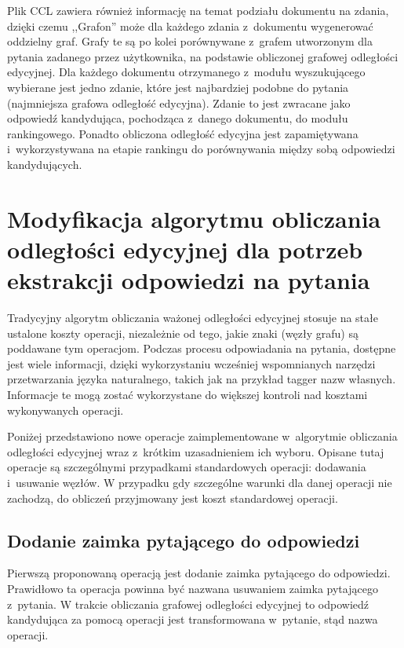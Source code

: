 \documentclass[a4paper, twoside, openright, 12pt]{report}
\begin{document}
        Plik CCL zawiera również informację na temat podziału dokumentu na zdania, dzięki czemu ,,Grafon'' może dla każdego
        zdania z~dokumentu wygenerować oddzielny graf. Grafy te są po kolei porównywane z~grafem utworzonym dla pytania
        zadanego przez użytkownika, na podstawie obliczonej grafowej odległości edycyjnej. Dla każdego dokumentu otrzymanego
        z~modułu wyszukującego wybierane jest jedno zdanie, które jest najbardziej podobne do pytania (najmniejsza grafowa
        odległość edycyjna). Zdanie to jest zwracane jako odpowiedź kandydująca, pochodząca z~danego dokumentu, do modułu
        rankingowego. Ponadto obliczona odległość edycyjna jest zapamiętywana i~wykorzystywana na etapie rankingu do porównywania
        między sobą odpowiedzi kandydujących.

    \section{Modyfikacja algorytmu obliczania odległości edycyjnej dla potrzeb ekstrakcji odpowiedzi na pytania}
        Tradycyjny algorytm obliczania ważonej odległości edycyjnej stosuje na stałe ustalone koszty operacji, niezależnie
        od tego, jakie znaki (węzły grafu) są poddawane tym operacjom. Podczas procesu odpowiadania na pytania, dostępne
        jest wiele informacji, dzięki wykorzystaniu wcześniej wspomnianych narzędzi przetwarzania języka naturalnego,
        takich jak na przykład tagger nazw własnych. Informacje te mogą zostać wykorzystane do większej kontroli nad
        kosztami wykonywanych operacji. %

        Poniżej przedstawiono nowe operacje zaimplementowane w~algorytmie obliczania odległości edycyjnej wraz z~krótkim
        uzasadnieniem ich wyboru. Opisane tutaj operacje są szczególnymi przypadkami standardowych operacji: dodawania
        i~usuwanie węzłów. W przypadku gdy szczególne warunki dla danej operacji nie zachodzą, do obliczeń przyjmowany
        jest koszt standardowej operacji.

        \subsection{Dodanie zaimka pytającego do odpowiedzi}
            Pierwszą proponowaną operacją jest dodanie zaimka pytającego do odpowiedzi. Prawidłowo ta operacja powinna być
            nazwana usuwaniem zaimka pytającego z~pytania. W trakcie obliczania grafowej odległości edycyjnej
            to odpowiedź kandydująca za pomocą operacji jest transformowana w~pytanie, stąd nazwa operacji.
\end{document}
